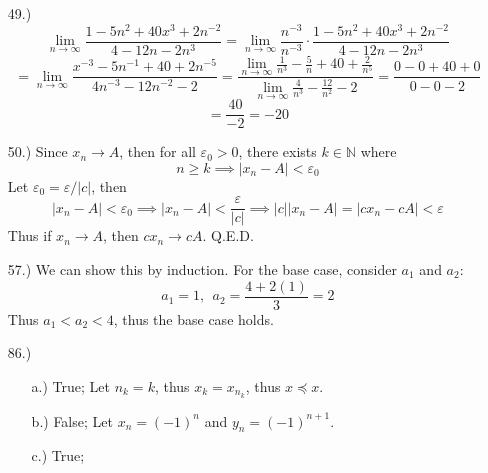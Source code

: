 \documentclass[12pt]{article}
\newcommand{\vertb}[1]{\left\vert#1\right\vert}
\newcommand{\e}{\varepsilon}
\newcommand{\lm}[1]{\displaystyle\lim_{#1}}
\begin{document}
\begin{itemize}
    \item [49.)]
    \[\lm{n\to\infty}\frac{1-5n^2+40x^3+2n^{-2}}{4-12n-2n^3}=\lm{n\to\infty}\frac{n^{-3}}{n^{-3}}\cdot\frac{1-5n^2+40x^3+2n^{-2}}{4-12n-2n^3}\]
    \[=\lm{n\to\infty}\frac{x^{-3}-5n^{-1}+40+2n^{-5}}{4n^{-3}-12n^{-2}-2}=\frac{\lm{n\to\infty}\frac{1}{n^3}-\frac{5}{n}+40+\frac{2}{n^5}}{\lm{n\to\infty}\frac{4}{n^3}-\frac{12}{n^2}-2}=\frac{0-0+40+0}{0-0-2}\]
    \[=\frac{40}{-2}=-20\]

    \item [50.)] Since $x_n\to A$, then for all $\e_0>0$, there exists $k\in\mathbb{N}$ where
    \[n\geq k\implies\vertb{x_n-A}<\e_0\]
    Let $\e_0=\e/\vertb{c}$, then
    \[\vertb{x_n-A}<\e_0\implies\vertb{x_n-A}<\frac{\e}{\vertb{c}}\implies\vertb{c}\vertb{x_n-A}=\vertb{cx_n-cA}<\e\]
    Thus if $x_n\to A$, then $cx_n\to cA$. Q.E.D.

    \item [57.)] We can show this by induction. For the base case, consider $a_1$ and $a_2$:
    \[a_1=1,\ \ a_2=\frac{4+2(1)}{3}=2\]
    Thus $a_1<a_2<4$, thus the base case holds.




    


    \item [86.)] \begin{itemize}
        \item [a.)] True; Let $n_k=k$, thus $x_k=x_{n_k}$, thus $x\preceq x$.

        \item [b.)] False; Let $x_n=(-1)^n$ and $y_n=(-1)^{n+1}$. 

        \item [c.)] True;


\end{itemize}
\end{itemize}
\end{document}
